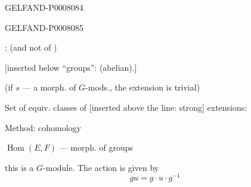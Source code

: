 \begin{GelfandAdjacentEvidence}{GELFAND-P000808}{4}


\end{GelfandAdjacentEvidence}
\begin{GelfandAdjacentEvidence}{GELFAND-P000808}{5}


;
 (and not of )
\end{GelfandAdjacentEvidence}


[inserted below “groups”: (abelian).]

(if \(s\) --- a morph. of \(G\)-mods., the extension is trivial)

Set of equiv. classes of [inserted above the line: strong] extensions:

Method: cohomology

\(\operatorname{Hom}(E,F)\) --- morph. of groups

this is a \(G\)-module. The action is given by
\[
gu=g\cdot u\cdot g^{-1}
\]


